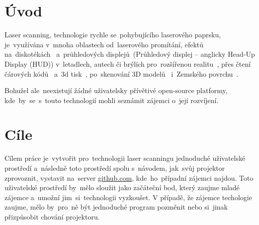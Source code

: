 \chapter*{Úvod}



Laser scanning, technologie rychle se~pohybujícího laserového paprsku, je~využívána v~mnoha oblastech od~laserového promítání, efektů na~diskotékách~\cite{laser-projection} a~průhledových displejů~(Průhledový displej -- anglicky Head-Up Display (HUD)) v~letadlech, autech či brýlích pro~rozšířenou realitu~\cite{laser-huds}, přes čtení čárových kódů~\cite{history-of-barcode-scanning} a~3d tisk~\cite{Photo-curing-3D-printing}, po~skenování 3D modelů~\cite{3d-model-scan} i~Zemského povrchu~\cite{heightmaps}.

Bohužel ale~neexistují žádné uživatelsky přívětivé open-source platformy, kde~by~se~s~touto technologií mohli seznámit zájemci o~její rozvíjení.

\chapter{Cíle}
Cílem práce je~vytvořit pro~technologii laser scanningu jednoduché uživatelské prostředí a~následně toto prostředí spolu s~návodem, jak~svůj projektor zprovoznit, vystavit na~server \url{github.com}, kde~ho~případní zájemci najdou.
Toto uživatelské prostředí by~mělo sloužit jako začáteční bod, který zaujme mladé zájemce a~umožní jim~si~technologii vyzkoušet.
V případě, že zájemce techologie zaujme, mělo by~pro~ně být jednoduché program pozměnit nebo si~jinak přizpůsobit chování projektoru.
